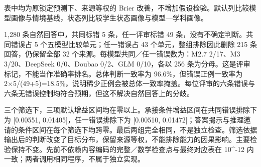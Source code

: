 \documentclass[11pt,a4paper,UTF8]{ctexart}
\begin{document}
表中均为原锁定预测下、来源等权的 Brier 改善，不增加假设检验。默认列比较模型画像与情境基线，状态列比较学生状态画像与模型—学科画像。

1,280 条自然回答中，共同标错 5 条，任一评审标错 49 条，没有不确定判断。共同错误占 5 个五模型比较单元；任一错误占 43 个单元，整组排除因此删除 215 条回答，仍保留全部 32 个来源。每模型共同／任一错误数为：M2.7 2/17、M3 3/20、DeepSeek 0/0、Doubao 0/2、GLM 0/10，各以 256 条为分母。这是评审标记，不能当作准确率排名。总体判断一致率为 96.6\%，但错误正例一致率为 2×5/(49+5)=18.5\%，说明稀少正例会被总体一致率掩盖。每位评审的六条错误与六条无错误控制均符合预期，但这不解决自然回答上的分歧。

三个筛选下，三项默认增益区间均在零以上。承接条件增益区间在共同错误排除下为 [0.00551, 0.01405]，任一错误排除下为 [0.00510, 0.01472]；答案揭示与推理邀请的条件区间在每个筛选下均跨零。最后两组完全相同，不是独立检查。筛选依据输出后的判断改变了目标分布，保留来源等权，不能排除能力的因果影响。主要检验保持不变。先前不依赖内容编码的完整／数学检查点与最终对应表在 10\textasciicircum{}-12 内一致；两者调用相同程序，不属于独立实现。


\end{document}
